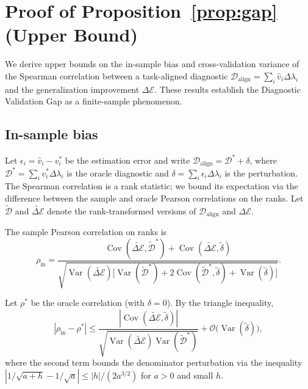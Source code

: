 \documentclass[twoside,11pt]{article}
\begin{document}




\appendix
\setcounter{figure}{0}
\setcounter{table}{0}
\renewcommand{\thefigure}{S\arabic{figure}}
\renewcommand{\thetable}{S\arabic{table}}

\section{Proof of Proposition~\ref{prop:gap} (Upper Bound)}
\label{app:proof}

We derive upper bounds on the in-sample bias and cross-validation variance of the Spearman correlation between a task-aligned diagnostic $\mathcal{D}_{\text{align}} = \sum_i \hat{v}_i \Delta\lambda_i$ and the generalization improvement $\Delta\mathcal{E}$.  These results establish the Diagnostic Validation Gap as a finite-sample phenomenon.

\subsection{In-sample bias}

Let $\epsilon_i = \hat{v}_i - v_i^*$ be the estimation error and write $\mathcal{D}_{\text{align}} = \mathcal{D}^* + \delta$, where $\mathcal{D}^* = \sum_i v_i^* \Delta\lambda_i$ is the oracle diagnostic and $\delta = \sum_i \epsilon_i \Delta\lambda_i$ is the perturbation.  The Spearman correlation is a rank statistic; we bound its expectation via the difference between the sample and oracle Pearson correlations on the ranks.  Let $\tilde{\mathcal{D}}$ and $\widetilde{\Delta\mathcal{E}}$ denote the rank-transformed versions of $\mathcal{D}_{\text{align}}$ and $\Delta\mathcal{E}$.

The sample Pearson correlation on ranks is
\[
\rho_{\text{in}} = \frac{\operatorname{Cov}(\widetilde{\Delta\mathcal{E}}, \tilde{\mathcal{D}}^*) + \operatorname{Cov}(\widetilde{\Delta\mathcal{E}}, \tilde{\delta})}
{\sqrt{\operatorname{Var}(\widetilde{\Delta\mathcal{E}})\bigl[\operatorname{Var}(\tilde{\mathcal{D}}^*) + 2\operatorname{Cov}(\tilde{\mathcal{D}}^*, \tilde{\delta}) + \operatorname{Var}(\tilde{\delta})\bigr]}}.
\]

Let $\rho^*$ be the oracle correlation (with $\delta = 0$).  By the triangle inequality,
\[
|\rho_{\text{in}} - \rho^*| \leq \frac{|\operatorname{Cov}(\widetilde{\Delta\mathcal{E}}, \tilde{\delta})|}
{\sqrt{\operatorname{Var}(\widetilde{\Delta\mathcal{E}})\operatorname{Var}(\tilde{\mathcal{D}}^*)}} + \mathcal{O}\bigl(\operatorname{Var}(\tilde{\delta})\bigr),
\]
where the second term bounds the denominator perturbation via the inequality $|1/\sqrt{a + h} - 1/\sqrt{a}| \leq |h|/(2a^{3/2})$ for $a > 0$ and small $h$.
\end{document}
